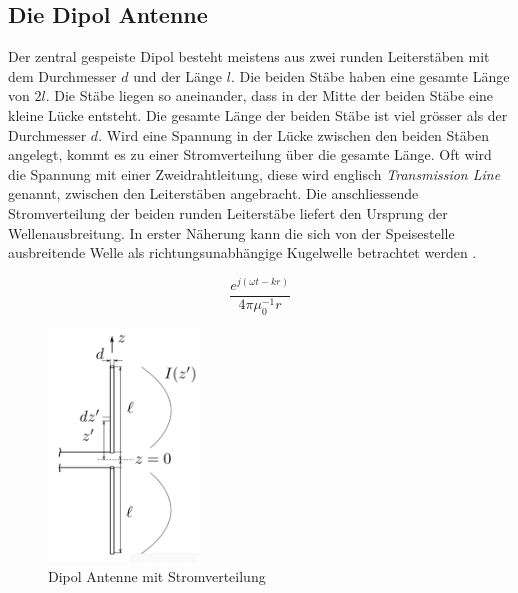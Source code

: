 \newpage
\subsection{Die Dipol Antenne}\label{sec:DipolAntenne}
Der zentral gespeiste Dipol besteht meistens aus zwei runden Leiterstäben mit dem Durchmesser $d$ und der Länge $l$. Die beiden Stäbe haben eine gesamte Länge von $2l$. Die  Stäbe liegen so aneinander, dass in der Mitte der beiden Stäbe eine kleine Lücke entsteht. Die gesamte Länge der beiden Stäbe ist viel grösser als  der Durchmesser $d$. Wird eine Spannung  in der Lücke zwischen den beiden Stäben angelegt, kommt es zu einer Stromverteilung über die gesamte Länge. Oft wird die Spannung mit einer Zweidrahtleitung,  diese wird englisch \textit{Transmission Line} genannt, zwischen den Leiterstäben angebracht. Die anschliessende Stromverteilung der beiden runden Leiterstäbe liefert den Ursprung der Wellenausbreitung. In erster Näherung kann die sich von der Speisestelle ausbreitende Welle als richtungsunabhängige Kugelwelle betrachtet werden \cite{elliott1981antenna}.

\begin{equation}\label{term:Kugelwelle}
\frac{e^{j(\omega t-kr)}}{4\pi \mu_{0}^{-1}r}
\end{equation}

\begin{figure}[!h]
	\centering
	\includegraphics[width=4cm]{content/bilder/Dipol_EMANT_S42.pdf}%
	\caption{Dipol Antenne mit Stromverteilung \cite{Tekom}}
	\label{FitzDipol}
\end{figure}

